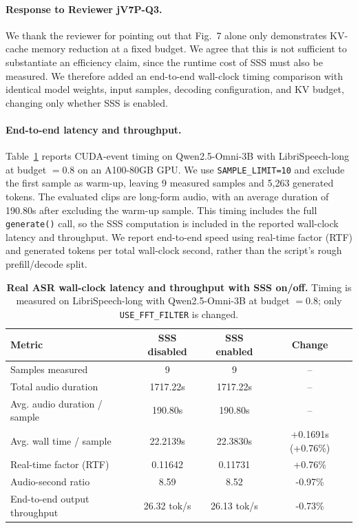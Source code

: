 \begin{answer}

    \paragraph{Response to Reviewer jV7P-Q3.}
    We thank the reviewer for pointing out that Fig.~7 alone only demonstrates KV-cache memory reduction at a fixed budget.
    We agree that this is not sufficient to substantiate an efficiency claim, since the runtime cost of SSS must also be measured.
    We therefore added an end-to-end wall-clock timing comparison with identical model weights, input samples, decoding configuration, and KV budget, changing only whether SSS is enabled.

    \paragraph{End-to-end latency and throughput.}
    Table~\ref{tab:rebuttal-jv7p-sss-e2e-latency} reports CUDA-event timing on Qwen2.5-Omni-3B with LibriSpeech-long at budget $=0.8$ on an A100-80GB GPU.
    We use \texttt{SAMPLE\_LIMIT=10} and exclude the first sample as warm-up, leaving 9 measured samples and 5{,}263 generated tokens.
    The evaluated clips are long-form audio, with an average duration of 190.80s after excluding the warm-up sample.
    This timing includes the full \texttt{generate()} call, so the SSS computation is included in the reported wall-clock latency and throughput.
    We report end-to-end speed using real-time factor (RTF) and generated tokens per total wall-clock second, rather than the script's rough prefill/decode split.

    \begin{table}[t]
    \centering
    \small
    \setlength{\tabcolsep}{4pt}
    \caption{\textbf{Real ASR wall-clock latency and throughput with SSS on/off.}
    Timing is measured on LibriSpeech-long with Qwen2.5-Omni-3B at budget $=0.8$; only \texttt{USE\_FFT\_FILTER} is changed.}
    \label{tab:rebuttal-jv7p-sss-e2e-latency}
    \begin{tabular}{lccc}
    \toprule
    \textbf{Metric} & \textbf{SSS disabled} & \textbf{SSS enabled} & \textbf{Change} \\
    \midrule
    Samples measured & 9 & 9 & -- \\
    Total audio duration & 1717.22s & 1717.22s & -- \\
    Avg. audio duration / sample & 190.80s & 190.80s & -- \\
    Avg. wall time / sample & 22.2139s & 22.3830s & +0.1691s (+0.76\%) \\
    Real-time factor (RTF) & 0.11642 & 0.11731 & +0.76\% \\
    Audio-second ratio & 8.59 & 8.52 & -0.97\% \\
    End-to-end output throughput & 26.32 tok/s & 26.13 tok/s & -0.73\% \\
    \bottomrule
    \end{tabular}
    \end{table}


\end{answer}
